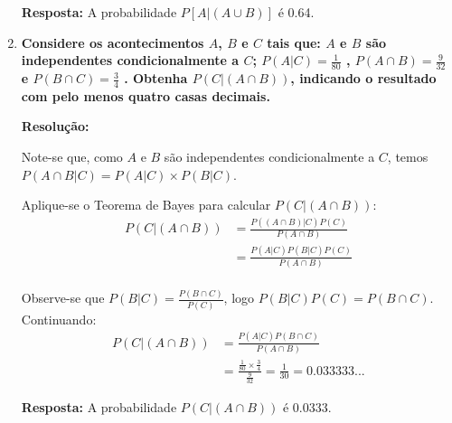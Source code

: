 \documentclass[a4paper,12pt]{article}
\begin{document}
\begin{enumerate}
\begin{mdframed}[backgroundcolor=gray!10, linewidth=0pt, innertopmargin=10pt, innerbottommargin=10pt]
  \textbf{Resposta:} A probabilidade $P[A|(A\cup B)]$ é 0.64.
  \end{mdframed}

  \vspace{0.5cm}

  \item \textbf{Considere os acontecimentos $A$, $B$ e $C$ tais que: $A$ e $B$ são independentes condicionalmente a $C$; $P(A|C)= \frac{1}{80}$ , $P(A \cap B)= \frac{9}{32}$ e $P(B \cap C)= \frac{3}{4}$ . Obtenha $P(C|(A \cap B))$, indicando o resultado com pelo menos quatro casas decimais.}
  
  \vspace{0.3cm}
  
  \begin{mdframed}[backgroundcolor=gray!10, linewidth=0pt, innertopmargin=10pt, innerbottommargin=10pt]
  \textbf{Resolução:}
  
  Note-se que, como $A$ e $B$ são independentes condicionalmente a $C$, temos $P(A \cap B|C) = P(A|C) \times P(B|C)$. 
  
  Aplique-se o Teorema de Bayes para calcular $P(C|(A \cap B))$:
  \begin{align*}
    P(C|(A \cap B)) &= \frac{P((A \cap B) | C) P(C)}{P(A \cap B)} \\
    &= \frac{P(A|C)P(B|C)P(C)}{P(A \cap B)} \\
  \end{align*}
  
  Observe-se que $P(B|C) = \frac{P(B \cap C)}{P(C)}$, logo $P(B|C)P(C) = P(B \cap C)$. Continuando:
  \begin{align*}
    P(C|(A \cap B)) &= \frac{P(A|C)P(B \cap C)}{P(A \cap B)} \\
    &= \frac{\frac{1}{80} \times \frac{3}{4}}{\frac{9}{32}} = \frac{1}{30} = 0.033333...
  \end{align*}

  \textbf{Resposta:} A probabilidade $P(C|(A \cap B))$ é 0.0333.
  \end{mdframed}
\end{enumerate}
\end{document}
